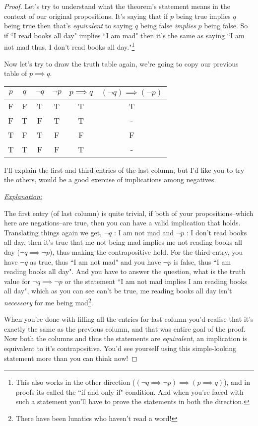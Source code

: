 \documentclass{article}
\begin{document}

\begin{proof}
	Let's try to understand what the theorem's statement means in the context of our original propositions. It's saying that if $p$ being true implies $q$ being true then that's \textit{equivalent} to saying $q$ being false \textit{implies} $p$ being false. So if ``I read books all day" implies ``I am mad" then it's the same as saying ``I am not mad thus, I don't read books all day."\footnote{This also works in the other direction ($(\neg q \implies \neg p) \implies (p \implies q)$), and in proofs its called the ``if and only if" condition. And when you're faced with such a statement you'll have to prove the statements in both the direction.}

	Now let's try to draw the truth table again, we're going to copy our previous table of $p \implies q$. 
	\begin{center}
		\begin{tabular}{c|c||c|c|c|c}
			$p$ & $q$ & $\neg q$ & $\neg p$ & $p \implies q$ & $(\neg q) \implies (\neg p)$ \\
			\hline
			F & F & T & T & T & T \\
			F & T & F & T & T & - \\
			T & F & T & F & F & F \\
			T & T & F & F & T & - \\
		\end{tabular}
	\end{center}
I'll explain the first and third entries of the last column, but I'd like you to try the others, would be a good exercise of implications among negatives. 

\textit{\underline{Explanation:}} \\
\vspace{2.5mm}

The first entry (of last column) is quite trivial, if both of your propositions--which here are negations--are true, then you can have a valid implication that holds. Translating things again we get, $\neg q$ : I am not mad and $\neg p$ : I don't read books all day, then it's true that me not being mad implies me not reading books all day ($\neg q \implies \neg p$), thus making the contrapositive hold. For the third entry, you have $\neg q$ as true, thus ``I am not mad" and you have $\neg p$ is false, thus ``I am reading books all day". And you have to answer the question, what is the truth value for $\neg q \implies \neg p$ or the statement ``I am not mad implies I am reading books all day", which as you can see can't be true, me reading books all day isn't \textit{necessary} for me being mad\footnote{There have been lunatics who haven't read a word!}. 

When you're done with filling all the entries for last column you'd realise that it's exactly the same as the previous column, and that was entire goal of the proof. Now both the columns and thus the statements are \textit{equivalent}, an implication is equivalent to it's contrapositive. You'd see yourself using this simple-looking statement more than you can think now! 
\end{proof}
\end{document}
